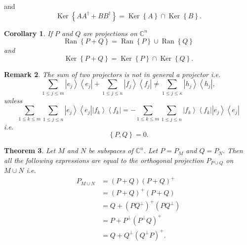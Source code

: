 \documentclass[aps,preprint]{revtex4}%
\newtheorem{theorem}{Theorem}
\newtheorem{corollary}[theorem]{Corollary}
\newtheorem{remark}[theorem]{Remark}
\begin{document}
and%
\begin{equation}
\operatorname{Ker}\left\{  AA^{\dagger}+BB^{\dagger}\right\}
=\operatorname{Ker}\left\{  A\right\}  \cap\operatorname{Ker}\left\{
B\right\}  .
\end{equation}


\begin{corollary}
If $P$ and $Q$ are projections on $\mathbb{C}^{n}$
\begin{equation}
\operatorname{Ran}\left\{  P+Q\right\}  =\operatorname{Ran}\left\{  P\right\}
\cup\operatorname{Ran}\left\{  Q\right\}
\end{equation}
and
\begin{equation}
\operatorname{Ker}\left\{  P+Q\right\}  =\operatorname{Ker}\left\{  P\right\}
\cap\operatorname{Ker}\left\{  Q\right\}  .
\end{equation}

\end{corollary}

\begin{remark}
The sum of two projectors is not in general a projector i.e.%
\begin{equation}
\sum_{1\leq j\leq m}\left\vert e_{j}\right\rangle \left\langle e_{j}%
\right\vert +\sum_{1\leq j\leq n}\left\vert f_{j}\right\rangle \left\langle
f_{j}\right\vert \neq\sum_{1\leq j\leq\kappa}\left\vert h_{j}\right\rangle
\left\langle h_{j}\right\vert ,
\end{equation}
unless
\begin{equation}
\sum_{1\leq k\leq m}\sum_{1\leq j\leq n}\left\vert e_{j}\right\rangle
\left\langle e_{j}\right\vert \left\vert f_{k}\right\rangle \left\langle
f_{k}\right\vert =-\sum_{1\leq k\leq m}\sum_{1\leq j\leq n}\left\vert
f_{k}\right\rangle \left\langle f_{k}\right\vert \left\vert e_{j}\right\rangle
\left\langle e_{j}\right\vert
\end{equation}
i.e.%
\begin{equation}
\left\{  P,Q\right\}  =0.
\end{equation}

\end{remark}

\begin{theorem}
Let $M$ and $N$ be subspaces of $\mathbb{C}^{n}$. Let $P=P_{M}$ and $Q=P_{N}$.
Then all the following expressions are equal to the orthogonal projection
$P_{P\cup Q}$ on $M\cup N$ i.e.%
\begin{align}
P_{M\cup N}  &  =\left(  P+Q\right)  \left(  P+Q\right)  ^{+}\\
&  =\left(  P+Q\right)  ^{+}\left(  P+Q\right) \\
&  =Q+\left(  PQ^{\bot}\right)  ^{+}\left(  PQ^{\bot}\right) \\
&  =P+P^{\bot}\left(  P^{\bot}Q\right)  ^{+}\\
&  =Q+Q^{\bot}\left(  Q^{\bot}P\right)  ^{+}.
\end{align}

\end{theorem}
\end{document}
